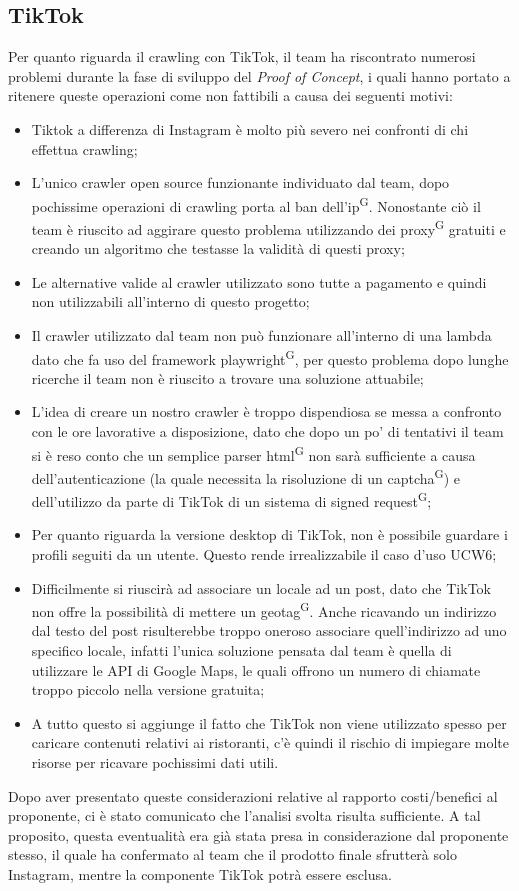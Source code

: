 \subsection{TikTok}
Per quanto riguarda il crawling con TikTok, il team ha riscontrato numerosi problemi durante la fase di sviluppo del \textit{Proof of Concept}, i quali hanno portato a ritenere queste operazioni come non fattibili a causa dei seguenti motivi:
\begin{itemize}
    \item Tiktok a differenza di Instagram è molto più severo nei confronti di chi effettua crawling;
    \item L'unico crawler open source funzionante individuato dal team, dopo pochissime operazioni di crawling porta al ban dell'ip\textsuperscript{G}. Nonostante ciò il team è riuscito ad aggirare questo problema utilizzando dei proxy\textsuperscript{G} gratuiti e creando un algoritmo che testasse la validità di questi proxy;
    \item Le alternative valide al crawler utilizzato sono tutte a pagamento e quindi non utilizzabili all'interno di questo progetto;
    \item Il crawler utilizzato dal team non può funzionare all'interno di una lambda dato che fa uso del framework playwright\textsuperscript{G}, per questo problema dopo lunghe ricerche il team non è riuscito a trovare una soluzione attuabile;
    \item L'idea di creare un nostro crawler è troppo dispendiosa se messa a confronto con le ore lavorative a disposizione, dato che dopo un po' di tentativi il team si è reso conto che un semplice parser html\textsuperscript{G} non sarà sufficiente a causa dell'autenticazione (la quale necessita la risoluzione di un captcha\textsuperscript{G}) e dell'utilizzo da parte di TikTok di un sistema di signed request\textsuperscript{G};
    \item Per quanto riguarda la versione desktop di TikTok, non è possibile guardare i profili seguiti da un utente. Questo rende irrealizzabile il caso d'uso UCW6;
    \item Difficilmente si riuscirà ad associare un locale ad un post, dato che TikTok non offre la possibilità di mettere un geotag\textsuperscript{G}. Anche ricavando un indirizzo dal testo del post risulterebbe troppo oneroso associare quell'indirizzo ad uno specifico locale, infatti l'unica soluzione pensata dal team è quella di utilizzare le API di Google Maps, le quali offrono un numero di chiamate troppo piccolo nella versione gratuita;
	
	    
    \item A tutto questo si aggiunge il fatto che TikTok non viene utilizzato spesso per caricare contenuti relativi ai ristoranti, c’è quindi il rischio di impiegare molte risorse per ricavare pochissimi dati utili.
\end{itemize}
Dopo aver presentato queste considerazioni relative al rapporto costi/benefici al proponente, ci è stato comunicato che l’analisi svolta risulta sufficiente. A tal proposito,  questa eventualità era già stata presa in considerazione dal proponente stesso, il quale ha confermato al team che il prodotto finale sfrutterà solo Instagram, mentre la componente TikTok potrà essere esclusa.
